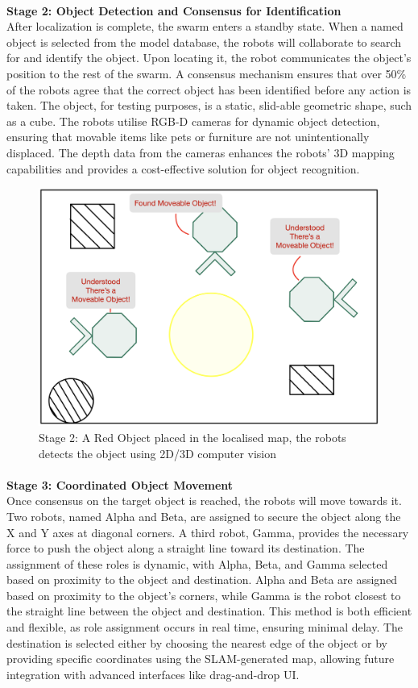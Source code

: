 \paragraph*{}
\textbf{Stage 2: Object Detection and Consensus for Identification} \\
After localization is complete, the swarm enters a standby state. When a named object is selected from the model database, the robots will collaborate to search for and identify the object. Upon locating it, the robot communicates the object’s position to the rest of the swarm. A consensus mechanism ensures that over 50\% of the robots agree that the correct object has been identified before any action is taken. The object, for testing purposes, is a static, slid-able geometric shape, such as a cube. The robots utilise RGB-D cameras for dynamic object detection, ensuring that movable items like pets or furniture are not unintentionally displaced. The depth data from the cameras enhances the robots’ 3D mapping capabilities and provides a cost-effective solution for object recognition.

\begin{figure}
    \centering
    \includegraphics[width=0.5\linewidth]{assets/images/project_outcome/stage_2.png}
    \caption{Stage 2: A Red Object placed in the localised map, the robots detects the object using 2D/3D computer vision}
    \label{fig:phase2}
\end{figure}

\paragraph*{}
\textbf{Stage 3: Coordinated Object Movement} \\
Once consensus on the target object is reached, the robots will move towards it. Two robots, named Alpha and Beta, are assigned to secure the object along the X and Y axes at diagonal corners. A third robot, Gamma, provides the necessary force to push the object along a straight line toward its destination. The assignment of these roles is dynamic, with Alpha, Beta, and Gamma selected based on proximity to the object and destination. Alpha and Beta are assigned based on proximity to the object’s corners, while Gamma is the robot closest to the straight line between the object and destination. This method is both efficient and flexible, as role assignment occurs in real time, ensuring minimal delay. The destination is selected either by choosing the nearest edge of the object or by providing specific coordinates using the SLAM-generated map, allowing future integration with advanced interfaces like drag-and-drop UI.

